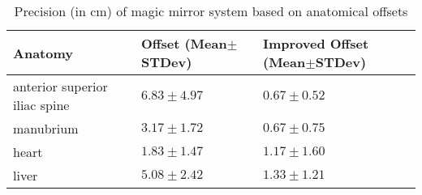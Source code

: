 \begin{table}
	\caption{Precision (in cm) of magic mirror system based on anatomical offsets}
	\label{tb:3-PRMM:results1}
	\scriptsize
	\begin{center}
		\begin{tabular}{p{4cm}|p{3cm}|p{4cm}}
			Anatomy & Offset (Mean$\pm$STDev) & Improved Offset (Mean$\pm$STDev) \\
			\hline
			anterior superior iliac spine & $6.83\pm4.97$ & $0.67\pm0.52$\\
			manubrium & $3.17\pm1.72$ & $0.67\pm0.75$ \\
			heart & $1.83\pm1.47$ & $1.17\pm1.60$\\
			liver & $5.08\pm2.42$ & $1.33\pm1.21$
		\end{tabular}
	\end{center}
\end{table}